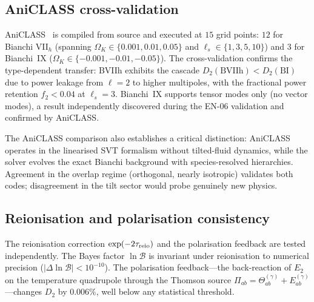 \subsection{AniCLASS cross-validation}
\label{sec:aniclass-validation}

AniCLASS~\cite{VicentePereiraPitrou2026} is compiled from
source and executed at $15$ grid points: $12$ for Bianchi
VII$_h$ (spanning $\Omega_K \in \{0.001, 0.01, 0.05\}$ and
$\ell_s \in \{1, 3, 5, 10\}$) and $3$ for Bianchi~IX
($\Omega_K \in \{-0.001, -0.01, -0.05\}$).  The cross-validation
confirms the type-dependent transfer: BVIIh exhibits the
cascade $D_2(\mathrm{BVIIh}) < D_2(\mathrm{BI})$ due to
power leakage from $\ell = 2$ to higher multipoles, with
the fractional power retention $f_2 < 0.04$ at $\ell_s = 3$.
Bianchi~IX supports tensor modes only (no vector modes), a
result independently discovered during the EN-06 validation
and confirmed by AniCLASS.

The AniCLASS comparison also establishes a critical distinction:
AniCLASS operates in the linearised SVT formalism without
tilted-fluid dynamics, while the solver evolves the exact Bianchi
background with species-resolved hierarchies.  Agreement in
the overlap regime (orthogonal, nearly isotropic) validates both
codes; disagreement in the tilt sector would probe genuinely new
physics.


\subsection{Reionisation and polarisation consistency}
\label{sec:reion-pol-check}
\label{sec:reionisation-invariance}

The reionisation correction $\exp(-2\tau_{\rm reio})$ and the
polarisation feedback are tested independently.  The Bayes factor
$\ln \mathcal{B}$ is invariant under reionisation to numerical
precision ($|\Delta \ln \mathcal{B}| < 10^{-10}$).  The
polarisation feedback---the back-reaction of $E_2$ on the
temperature quadrupole through the Thomson source
$\Pi_{ab} = \Theta^{(\gamma)}_{ab} + E^{(\gamma)}_{ab}$---changes
$D_2$ by $0.006\%$, well below any statistical threshold.




